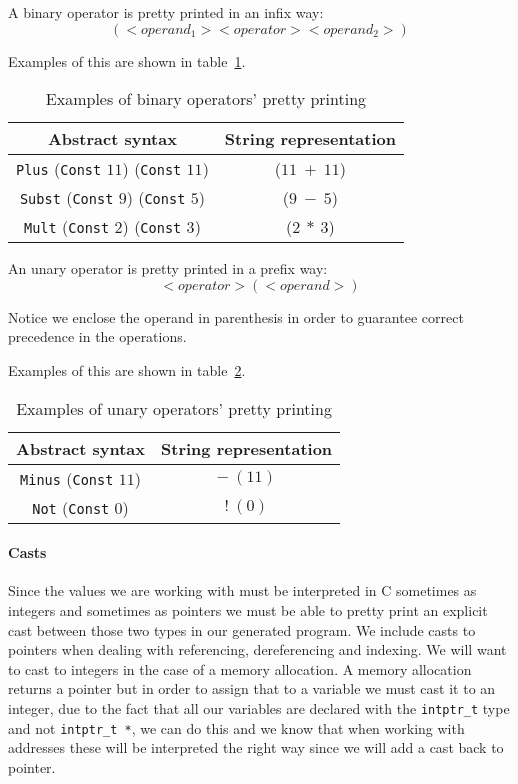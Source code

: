 A binary operator is pretty printed in an infix way:
\begin{equation*}
(<operand_1> <operator> <operand_2>)
\end{equation*}

Examples of this are shown in table~\ref{tab:pretty_bin_op}.

\begin{table}[h!]
\centering
\begin{tabular}{|c|c|}
  \hline
  \textbf{Abstract syntax} & \textbf{String representation} \\ [0.5ex]
  \hline \hline
  \verb|Plus| (\verb|Const| $11$) (\verb|Const| $11$) & ($11\ +\ 11$) \\
  \verb|Subst| (\verb|Const| $9$) (\verb|Const| $5$) & ($9\ -\ 5$) \\
  \verb|Mult| (\verb|Const| $2$) (\verb|Const| $3$) & ($2\ *\ 3$) \\
  \hline
\end{tabular}

\caption{Examples of binary operators' pretty printing}
\label{tab:pretty_bin_op}
\end{table}

An unary operator is pretty printed in a prefix way:
\begin{equation*}
<operator> (<operand>)
\end{equation*}

Notice we enclose the operand in parenthesis in order to guarantee correct precedence in the operations.

Examples of this are shown in table~\ref{tab:pretty_un_op}.

\begin{table}[h!]
\centering
\begin{tabular}{|c|c|}
  \hline
  \textbf{Abstract syntax} & \textbf{String representation} \\ [0.5ex]
  \hline \hline
  \verb|Minus| (\verb|Const| $11$) & $-\ (11)$ \\
  \verb|Not| (\verb|Const| $0$) & $!\ (0)$ \\
  \hline
\end{tabular}

\caption{Examples of unary operators' pretty printing}
\label{tab:pretty_un_op}
\end{table}

\paragraph{Casts}
Since the values we are working with must be interpreted in C sometimes as integers and sometimes as pointers we must be able to pretty print an explicit cast between those two types in our generated program.
We include casts to pointers when dealing with referencing, dereferencing and indexing.
We will want to cast to integers in the case of a memory allocation.
A memory allocation returns a pointer but in order to assign that to a variable we must cast it to an integer, due to the fact that all our variables are declared with the \verb|intptr_t| type and not \verb|intptr_t *|, we can do this and we know that when working with addresses these will be interpreted the right way since we will add a cast back to pointer.


